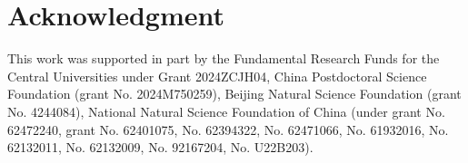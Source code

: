 \documentclass[conference]{IEEEtran}
\begin{document}





\section{Acknowledgment}

This work was supported in part by the Fundamental Research Funds for the Central Universities under Grant 2024ZCJH04, China Postdoctoral Science Foundation (grant No. 2024M750259), Beijing Natural Science Foundation (grant No. 4244084), National Natural Science Foundation of China (under grant No. 62472240, grant No. 62401075, No. 62394322, No. 62471066, No. 61932016, No. 62132011, No. 62132009, No. 92167204, No. U22B203).
\end{document}
